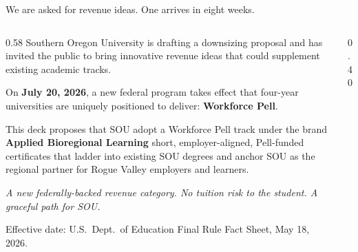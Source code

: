 \documentclass[aspectratio=169,11pt]{beamer}
\newcommand{\eyebrow}[1]{%
  {\sffamily\fontsize{7.5pt}{9pt}\selectfont
   \color{textMuted}%
   \MakeUppercase{#1}%
  }%
}
\newcommand{\monoLabel}[1]{%
  {\ttfamily\fontsize{7.5pt}{9pt}\selectfont\color{textMuted}#1}%
}
\newcommand{\theEyebrowText}{}
\newcommand{\frametitleEyebrow}[1]{\renewcommand{\theEyebrowText}{#1}}
\begin{document}
\frametitleEyebrow{SOU / financial inflection}
\begin{frame}{We are asked for revenue ideas. One arrives in eight weeks.}
  \begin{columns}[T,onlytextwidth]
    \begin{column}{0.58\textwidth}
      \rmfamily\fontsize{11.5pt}{15.5pt}\selectfont
      \color{textPrimary}
      Southern Oregon University is drafting a downsizing
      proposal and has invited the public to bring innovative
      revenue ideas that could supplement existing academic
      tracks.\par
      \vspace{8pt}
      On \textbf{July 20, 2026}, a new federal program takes
      effect that four-year universities are uniquely positioned
      to deliver: \textbf{Workforce Pell}.\par
      \vspace{8pt}
      This deck proposes that SOU adopt a Workforce Pell track
      under the brand \textbf{Applied Bioregional Learning}
      \textemdash{} short, employer-aligned, Pell-funded
      certificates that ladder into existing SOU degrees and
      anchor SOU as the regional partner for Rogue Valley
      employers and learners.\par
      \vspace{10pt}
      \color{textSecondary}\itshape\fontsize{10pt}{13.5pt}\selectfont
      A new federally-backed revenue category. No tuition risk
      to the student. A graceful path for SOU.\par
      \vspace{8pt}
      \monoLabel{Effective date: U.S.\ Dept.\ of Education Final Rule Fact Sheet, May 18, 2026.}
    \end{column}
    \begin{column}{0.40\textwidth}
      \centering
\end{column}
\end{columns}
\end{frame}
\end{document}
